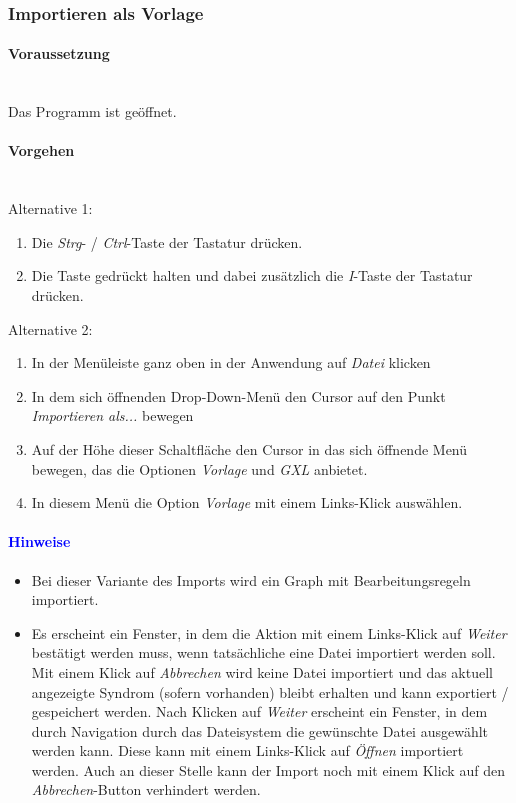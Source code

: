 \documentclass[enabledeprecatedfontcommands,fontsize=11pt,paper=a4,twoside]{scrartcl}
\newcounter{one}
\newcommand*{\hint}{\paragraph{\textcolor{blue}{Hinweise}}}
\newcommand*{\condition}{\paragraph{Voraussetzung}$\;$ \vspace{0.2cm}\\}
\newcommand*{\actions}{\paragraph{Vorgehen} $\;$\vspace{0.2cm}\\}
\begin{document}
				\newpage
	\subsubsection{Importieren als  Vorlage}
		\condition 	
		Das Programm ist geöffnet.
		\actions
		Alternative 1:
		\begin{enumerate}
				\item Die \textit{Strg}- / \textit{Ctrl}-Taste der Tastatur drücken.
				\item Die Taste gedrückt halten und dabei zusätzlich die \textit{I}-Taste der Tastatur drücken.
		\end{enumerate}				
		Alternative 2:
		\begin{enumerate}
				\item In der Menüleiste ganz oben in der Anwendung auf \textit{Datei} klicken 
				\item In dem sich öffnenden Drop-Down-Menü den Cursor auf den Punkt \textit{Importieren als...} bewegen
				\item Auf der Höhe dieser Schaltfläche den Cursor in das sich öffnende Menü bewegen, das die Optionen \textit{Vorlage} und \textit{GXL} anbietet.
				\item In diesem Menü die Option \textit{Vorlage} mit einem Links-Klick auswählen.
		\end{enumerate}		
		\hint
		\begin{itemize}
				\item Bei dieser Variante des Imports wird ein Graph mit Bearbeitungsregeln importiert.
				\item Es erscheint ein Fenster, in dem die Aktion mit einem Links-Klick auf \textit{Weiter} bestätigt werden muss, wenn tatsächliche eine Datei importiert werden soll. Mit einem Klick auf \textit{Abbrechen} wird keine Datei importiert und das aktuell angezeigte Syndrom (sofern vorhanden) bleibt erhalten und kann exportiert / gespeichert werden. Nach Klicken auf \textit{Weiter} erscheint ein Fenster, in dem durch Navigation durch das Dateisystem die gewünschte Datei ausgewählt werden kann. Diese kann mit einem Links-Klick auf \textit{Öffnen} importiert werden. Auch an dieser Stelle kann der Import noch mit einem Klick auf den \textit{Abbrechen}-Button verhindert werden.
		\end{itemize}

					\newpage
\end{document}
